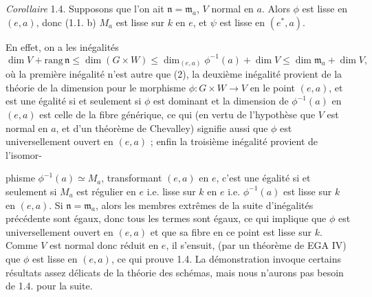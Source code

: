 \documentclass[11pt,a4paper]{article}
\begin{document}
\emph{Corollaire} 1.4. Supposons que l'on ait $\mathfrak{n} =
\mathfrak{m}_a$, $V$ normal en $a$. Alors $\phi$ est lisse en $(e,a)$,
donc (1.1. b) $M_a$ est lisse sur $k$ en $e$, et $\psi$ est lisse en
$(e^{*}, a)$.

En effet, on a les inégalités
\[
  \dim V + \mathrm{rang}\, \mathfrak{n} \leqslant \dim(G \times W)
  \leqslant \dim_{(e,a)} \phi^{-1}(a) + \dim V
  \leqslant \dim \mathfrak{m}_a + \dim V ,
\]
où la première inégalité n'est autre que (2), la deuxième inégalité provient
de la théorie de la dimension pour le morphisme $\phi : G \times W \to V$ en
le point $(e,a)$, et est une égalité si et seulement si $\phi$ est dominant et
la dimension de $\phi^{-1}(a)$ en $(e,a)$ est celle de la fibre générique, ce
qui (en vertu de l'hypothèse que $V$ est normal en $a$, et d'un théorème de
Chevalley) signifie aussi que $\phi$ est universellement ouvert en $(e,a)$ ;
enfin la troisième inégalité  provient de l'isomor-



phisme $\phi^{-1}(a) \simeq M_a$, transformant $(e,a)$ en $e$, c'est une
égalité si et seulement si $M_a$ est régulier en $e$ i.e. lisse sur $k$
en $e$ i.e. $\phi^{-1}(a)$ est lisse sur $k$ en $(e,a)$. Si
$\mathfrak{n} = \mathfrak{m}_a$, alors les membres extrêmes de la suite
d'inégalités précédente sont égaux, donc tous les termes sont égaux, ce qui
implique que $\phi$ est universellement ouvert en $(e,a)$ et que sa fibre en
ce point est lisse sur $k$. Comme $V$ est  normal donc réduit
en $e$, il s'ensuit, (par un théorème de EGA IV) que $\phi$ est lisse
 en $(e,a)$, ce qui prouve 1.4. La démonstration
invoque certains résultats assez délicats de la théorie des schémas, mais nous
n'aurons pas besoin de 1.4. pour la suite.
\end{document}
